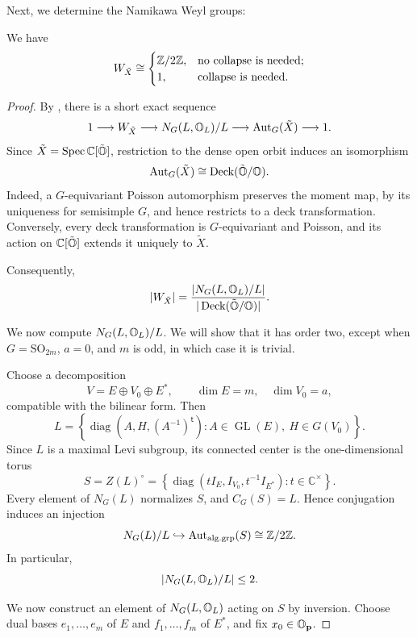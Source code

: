 Next, we determine the Namikawa Weyl groups:

\begin{prop}
  We have
  \[
    W_{\tilde X}\cong
    \begin{cases}
      \mathbb{Z}/2\mathbb{Z}, & \text{no collapse is needed};\\
      1, & \text{collapse is needed}.
    \end{cases}
  \]
\end{prop}

\begin{proof}
  By \cite[Proposition~4.7(3)]{Losev2022Deformations}, there is
  a short exact sequence
  \[
    1\longrightarrow W_{\tilde X}
    \longrightarrow N_G(L,\mathbb{O}_L)/L
    \longrightarrow \operatorname{Aut}_G(\tilde X)
    \longrightarrow1.
  \]
  Since $\tilde X=\operatorname{Spec}\mathbb C[\tilde{\mathbb{O}}]$,
  restriction to the dense open orbit induces an isomorphism
  \[
    \operatorname{Aut}_G(\tilde X)
    \cong
    \operatorname{Deck}(\tilde{\mathbb{O}}/\mathbb{O}).
  \]
  Indeed, a $G$-equivariant Poisson automorphism preserves
  the moment map, by its uniqueness for semisimple $G$,
  and hence restricts to a deck transformation.
  Conversely, every deck transformation is
  $G$-equivariant and Poisson, and its action on
  $\mathbb C[\tilde{\mathbb{O}}]$ extends it uniquely to $\tilde X$.

  Consequently,
  \[
    |W_{\tilde X}|
    =
    \frac{|N_G(L,\mathbb{O}_L)/L|}
    {|\operatorname{Deck}(\tilde{\mathbb{O}}/\mathbb{O})|}.
  \]


  We now compute $N_G(L,\mathbb{O}_L)/L$. We will show that it has order two, except when $G=\mathrm{SO}_{2m}$, $a=0$, and $m$ is odd, in which case it is trivial.
  
  Choose a decomposition
  \[
    V=E\oplus V_0\oplus E^*,
    \qquad \dim E=m,\quad \dim V_0=a,
  \]
  compatible with the bilinear form. Then
  \[
    L=
    \left\{
      \operatorname{diag}(A,H,(A^{-1})^{\mathsf t}):
      A\in\operatorname{GL}(E),\ H\in G(V_0)
    \right\}.
  \]
  Since $L$ is a maximal Levi subgroup, its connected
  center is the one-dimensional torus
  \[
    S=Z(L)^\circ
     =\left\{
       \operatorname{diag}(tI_E,I_{V_0},t^{-1}I_{E^*}):
       t\in\mathbb C^\times
      \right\}.
  \]
  Every element of $N_G(L)$ normalizes $S$, and
  $C_G(S)=L$. Hence conjugation induces an injection
  \[
    N_G(L)/L
    \hookrightarrow
    \operatorname{Aut}_{\mathrm{alg.grp}}(S)
    \cong\mathbb{Z}/2\mathbb{Z}.
  \]
  In particular,
  \[
    |N_G(L,\mathbb{O}_L)/L|\le2.
  \]

  We now construct an element of $N_G(L,\mathbb{O}_L)$
  acting on $S$ by inversion.
  Choose dual bases $e_1,\ldots,e_m$ of $E$ and
  $f_1,\ldots,f_m$ of $E^*$, and fix
  $x_0\in\mathbb{O}_{\mathbf p}$.


\end{proof}
